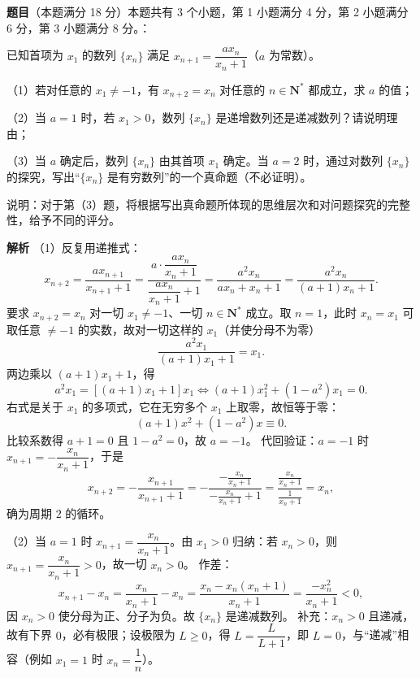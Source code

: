 \begin{answer}

\textbf{题目}（本题满分 18 分）本题共有 3 个小题，第 1 小题满分 4 分，第 2 小题满分 6 分，第 3 小题满分 8 分。：

已知首项为 $x_1$ 的数列 $\{x_n\}$ 满足 $x_{n+1}=\dfrac{ax_n}{x_n+1}$（$a$ 为常数）。

（1）若对任意的 $x_1\neq-1$，有 $x_{n+2}=x_n$ 对任意的 $n\in\mathbf N^*$ 都成立，求 $a$ 的值；

（2）当 $a=1$ 时，若 $x_1>0$，数列 $\{x_n\}$ 是递增数列还是递减数列？请说明理由；

（3）当 $a$ 确定后，数列 $\{x_n\}$ 由其首项 $x_1$ 确定。当 $a=2$ 时，通过对数列 $\{x_n\}$ 的探究，写出“$\{x_n\}$ 是有穷数列”的一个真命题（不必证明）。

说明：对于第（3）题，将根据写出真命题所体现的思维层次和对问题探究的完整性，给予不同的评分。

\textbf{解析}
（1）反复用递推式：
\nopagebreak[4]
\[x_{n+2}=\frac{ax_{n+1}}{x_{n+1}+1}=\frac{a\cdot\dfrac{ax_n}{x_n+1}}{\dfrac{ax_n}{x_n+1}+1}=\frac{a^2x_n}{ax_n+x_n+1}=\frac{a^2x_n}{\left(a+1\right)x_n+1}.\]
要求 $x_{n+2}=x_n$ 对一切 $x_1\neq-1$、一切 $n\in\mathbf N^*$ 成立。取 $n=1$，此时 $x_n=x_1$ 可取任意 $\neq-1$ 的实数，故对一切这样的 $x_1$（并使分母不为零）
\nopagebreak[4]
\[\frac{a^2x_1}{\left(a+1\right)x_1+1}=x_1.\]
两边乘以 $\left(a+1\right)x_1+1$，得
\nopagebreak[4]
\[a^2x_1=\left[\left(a+1\right)x_1+1\right]x_1\iff\left(a+1\right)x_1^2+\left(1-a^2\right)x_1=0.\]
右式是关于 $x_1$ 的多项式，它在无穷多个 $x_1$ 上取零，故恒等于零：
\nopagebreak[4]
\[\left(a+1\right)x^2+\left(1-a^2\right)x\equiv0.\]
比较系数得 $a+1=0$ 且 $1-a^2=0$，故 $a=-1$。
代回验证：$a=-1$ 时 $x_{n+1}=-\dfrac{x_n}{x_n+1}$，于是
\nopagebreak[4]
\[x_{n+2}=-\frac{x_{n+1}}{x_{n+1}+1}=-\frac{-\frac{x_n}{x_n+1}}{-\frac{x_n}{x_n+1}+1}=\frac{\frac{x_n}{x_n+1}}{\frac{1}{x_n+1}}=x_n,\]
确为周期 $2$ 的循环。

（2）当 $a=1$ 时 $x_{n+1}=\dfrac{x_n}{x_n+1}$。由 $x_1>0$ 归纳：若 $x_n>0$，则 $x_{n+1}=\dfrac{x_n}{x_n+1}>0$，故一切 $x_n>0$。
作差：
\nopagebreak[4]
\[x_{n+1}-x_n=\frac{x_n}{x_n+1}-x_n=\frac{x_n-x_n\left(x_n+1\right)}{x_n+1}=\frac{-x_n^2}{x_n+1}<0,\]
因 $x_n>0$ 使分母为正、分子为负。故 $\{x_n\}$ 是递减数列。
补充：$x_n>0$ 且递减，故有下界 $0$，必有极限；设极限为 $L\ge0$，得 $L=\dfrac{L}{L+1}$，即 $L=0$，与“递减”相容（例如 $x_1=1$ 时 $x_n=\dfrac1n$）。


\end{answer}
